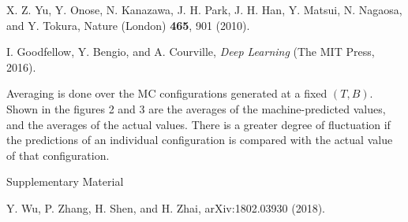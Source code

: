 \documentclass[reprint,amsmath,amssymb,aps,showpacs,superscriptaddress,prl]{revtex4-1}
\begin{document}
\begin{thebibliography}{99}
 X. Z. Yu, Y. Onose, N. Kanazawa, J. H. Park, J. H. Han, Y. Matsui, N. Nagaosa, and Y. Tokura, Nature (London) {\bf 465}, 901 (2010).

 I. Goodfellow, Y. Bengio, and A. Courville, {\it Deep Learning} (The MIT Press, 2016).

 Averaging is done over the MC configurations generated at a fixed $(T,B)$. Shown in the figures 2 and 3 are the averages of the machine-predicted values, and the averages of the actual values. There is a greater degree of fluctuation if the predictions of an individual configuration is compared with the actual value of that configuration.

 Supplementary Material

 Y. Wu, P. Zhang, H. Shen, and H. Zhai, arXiv:1802.03930 (2018).

\end{thebibliography}

%
%
\end{document}

